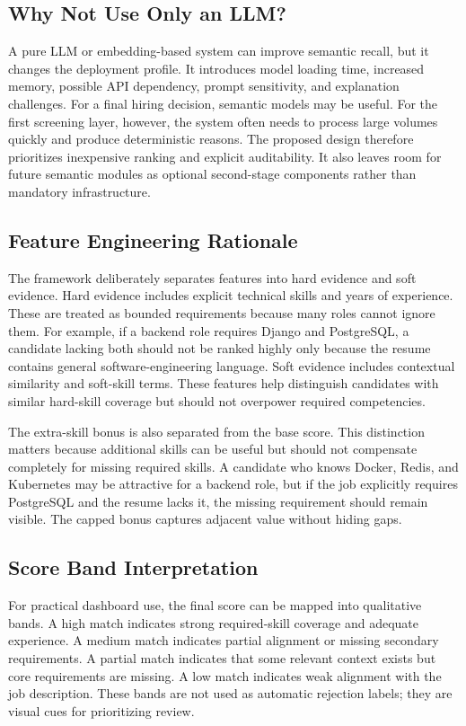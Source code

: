 \documentclass[conference]{IEEEtran}
\begin{document}
\subsection{Why Not Use Only an LLM?}
A pure LLM or embedding-based system can improve semantic recall, but it changes the deployment profile. It introduces model loading time, increased memory, possible API dependency, prompt sensitivity, and explanation challenges. For a final hiring decision, semantic models may be useful. For the first screening layer, however, the system often needs to process large volumes quickly and produce deterministic reasons. The proposed design therefore prioritizes inexpensive ranking and explicit auditability. It also leaves room for future semantic modules as optional second-stage components rather than mandatory infrastructure.

\subsection{Feature Engineering Rationale}
The framework deliberately separates features into hard evidence and soft evidence. Hard evidence includes explicit technical skills and years of experience. These are treated as bounded requirements because many roles cannot ignore them. For example, if a backend role requires Django and PostgreSQL, a candidate lacking both should not be ranked highly only because the resume contains general software-engineering language. Soft evidence includes contextual similarity and soft-skill terms. These features help distinguish candidates with similar hard-skill coverage but should not overpower required competencies.

The extra-skill bonus is also separated from the base score. This distinction matters because additional skills can be useful but should not compensate completely for missing required skills. A candidate who knows Docker, Redis, and Kubernetes may be attractive for a backend role, but if the job explicitly requires PostgreSQL and the resume lacks it, the missing requirement should remain visible. The capped bonus captures adjacent value without hiding gaps.

\subsection{Score Band Interpretation}
For practical dashboard use, the final score can be mapped into qualitative bands. A high match indicates strong required-skill coverage and adequate experience. A medium match indicates partial alignment or missing secondary requirements. A partial match indicates that some relevant context exists but core requirements are missing. A low match indicates weak alignment with the job description. These bands are not used as automatic rejection labels; they are visual cues for prioritizing review.
\end{document}
